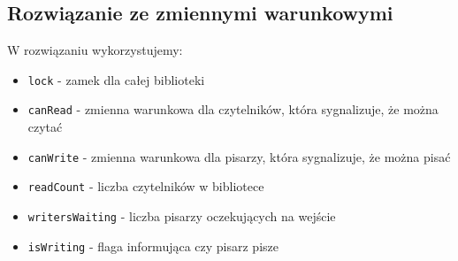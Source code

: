 \documentclass[11pt]{article}
\begin{document}
\subsection*{Rozwiązanie ze zmiennymi warunkowymi}
\label{sec:org09f00d0}
W rozwiązaniu wykorzystujemy:
\begin{itemize}
\item \texttt{lock} - zamek dla całej biblioteki
\item \texttt{canRead} - zmienna warunkowa dla czytelników, która sygnalizuje, że można czytać
\item \texttt{canWrite} - zmienna warunkowa dla pisarzy, która sygnalizuje, że można pisać
\item \texttt{readCount} - liczba czytelników w bibliotece
\item \texttt{writersWaiting} - liczba pisarzy oczekujących na wejście
\item \texttt{isWriting} - flaga informująca czy pisarz pisze
\end{itemize}
\end{document}
